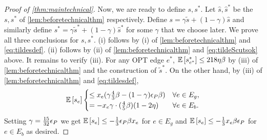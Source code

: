 \begin{proof}[Proof of \cref{thm:maintechnical}]
Now, we are ready to define $s,s^*$. Let $\hat{s},\hat{s}^*$ be the $s,s^*$ of \cref{lem:beforetechnicalthm} respectively.
Define $s=\gamma \tilde{s} + (1-\gamma) \hat{s}$ and similarly define $s^*=\gamma\tilde{s}^*+(1-\gamma)\hat{s}^*$ for some $\gamma$ that we choose later. 
We prove all three conclusions for $s,s^*$. (i) follows by (i) of \cref{lem:beforetechnicalthm} and  \cref{eq:tildesdef}. (ii) follows by (ii) of \cref{lem:beforetechnicalthm} and \cref{eq:tildeScutsok} above. 
It remains to verify (iii). For any OPT edge $e^*$, ${\mathbb{E}}\left[s^*_{e^*}\right]\leq 218\eta\beta$ by (iii) of \cref{lem:beforetechnicalthm} and the construction of $\tilde{s}^*$. On the other hand, by (iii) of \cref{lem:beforetechnicalthm} and \cref{eq:tildesdef},
\begin{align*} 
{\mathbb{E}}\left[s_e\right] \begin{cases}\leq  x_e  (\gamma \frac{4}{3}\beta - (1-\gamma){\epsilon}_P\beta ) & \forall e\in E_g,\\	
= -x_e\gamma\cdot (\frac{4}{5}\beta)(1-2\eta)& \forall e\in E_b.
\end{cases}
\end{align*}
Setting $\gamma=\frac{15}{32}{\epsilon}_P$ we get ${\mathbb{E}}\left[s_e\right]\leq -\frac{1}{3}{\epsilon}_P\beta x_e$ for $e\in E_g$ and ${\mathbb{E}}\left[s_e\right]\leq -\frac{1}{3}x_e\beta\epsilon_P$ for $e\in E_b$ as desired.
\end{proof}
